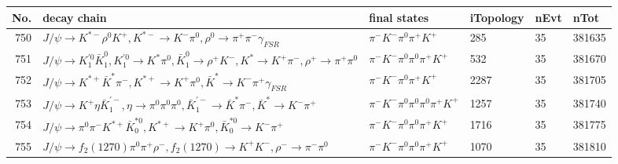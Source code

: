\begin{table}[htbp] 
\begin{center}
\begin{small}
\begin{tabular}{rlllll}\hline\hline
 No. & decay chain & final states &  iTopology & nEvt & nTot \\\hline
750&$J/\psi       \rightarrow K^{*-}         \rho^{0}      K^{+}          , K^{*-}          \rightarrow K^{-}          \pi^{0}        , \rho^{0}       \rightarrow \pi^{+}        \pi^{-}        \gamma_{FSR} $&$\pi^{-}        K^{-}          \pi^{0}        \pi^{+}        K^{+}          $&  285&   35&381635\\
751&$J/\psi       \rightarrow K_1^{'0}      \bar{K}_1^{0} , K_1^{'0}       \rightarrow K^{*}          \pi^{0}        , \bar{K}_1^{0}  \rightarrow \rho^{+}      K^{-}          , K^{*}           \rightarrow K^{+}          \pi^{-}        , \rho^{+}       \rightarrow \pi^{+}        \pi^{0}        $&$\pi^{-}        K^{-}          \pi^{0}        \pi^{0}        \pi^{+}        K^{+}          $&  532&   35&381670\\
752&$J/\psi       \rightarrow K^{*+}         \bar{K}^{*}   \pi^{-}        , K^{*+}          \rightarrow K^{+}          \pi^{0}        , \bar{K}^{*}    \rightarrow K^{-}          \pi^{+}        \gamma_{FSR} $&$\pi^{-}        K^{-}          \pi^{0}        \pi^{+}        K^{+}          $& 2287&   35&381705\\
753&$J/\psi       \rightarrow K^{+}          \eta          \bar{K}_1^{'-}, \eta           \rightarrow \pi^{0}        \pi^{0}        \pi^{0}        , \bar{K}_1^{'-} \rightarrow \bar{K}^{*}   \pi^{-}        , \bar{K}^{*}    \rightarrow K^{-}          \pi^{+}        $&$\pi^{-}        K^{-}          \pi^{0}        \pi^{0}        \pi^{0}        \pi^{+}        K^{+}          $& 1257&   35&381740\\
754&$J/\psi       \rightarrow \pi^{0}        \pi^{-}        K^{*+}         \bar{K}_0^{*0}, K^{*+}          \rightarrow K^{+}          \pi^{0}        , \bar{K}_0^{*0} \rightarrow K^{-}          \pi^{+}        $&$\pi^{-}        K^{-}          \pi^{0}        \pi^{0}        \pi^{+}        K^{+}          $& 1716&   35&381775\\
755&$J/\psi       \rightarrow f_{2}(1270)    \pi^{0}        \pi^{+}        \rho^{-}      , f_{2}(1270)     \rightarrow K^{+}          K^{-}          , \rho^{-}       \rightarrow \pi^{-}        \pi^{0}        $&$\pi^{-}        K^{-}          \pi^{0}        \pi^{0}        \pi^{+}        K^{+}          $& 1070&   35&381810\\

\end{tabular}
\end{small}
\end{center}
\end{table}
